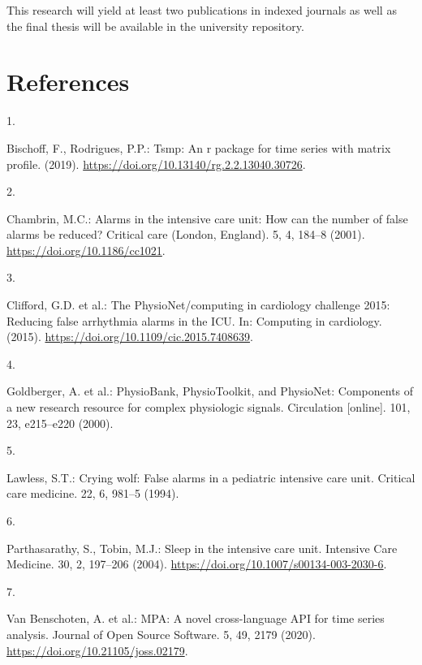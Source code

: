 \documentclass[runningheads]{llncs}
\newlength{\cslhangindent}
\newlength{\csllabelwidth}
\newenvironment{CSLReferences}[2] %
 {%
  \setlength{\parindent}{0pt}
  \ifodd #1 \everypar{\setlength{\hangindent}{\cslhangindent}}\ignorespaces\fi
  \ifnum #2 > 0
  \setlength{\parskip}{#2\baselineskip}
  \fi
 }%
 {}
\newcommand{\CSLLeftMargin}[1]{\parbox[t]{\csllabelwidth}{#1}}
\newcommand{\CSLRightInline}[1]{\parbox[t]{\linewidth - \csllabelwidth}{#1}\break}
\begin{document}
This research will yield at least two publications in indexed journals
as well as the final thesis will be available in the university
repository.

\hypertarget{references}{%
\section*{References}\label{references}}

\hypertarget{refs}{}
\begin{CSLReferences}{0}{0}
\leavevmode{}%
\CSLLeftMargin{1. }
\CSLRightInline{Bischoff, F., Rodrigues, P.P.: Tsmp: An r package for
time series with matrix profile. (2019).
\url{https://doi.org/10.13140/rg.2.2.13040.30726}.}

\leavevmode{}%
\CSLLeftMargin{2. }
\CSLRightInline{Chambrin, M.C.: Alarms in the intensive care unit: How
can the number of false alarms be reduced? Critical care (London,
England). 5, 4, 184--8 (2001). \url{https://doi.org/10.1186/cc1021}.}

\leavevmode{}%
\CSLLeftMargin{3. }
\CSLRightInline{Clifford, G.D. et al.: The PhysioNet/computing in
cardiology challenge 2015: Reducing false arrhythmia alarms in the ICU.
In: Computing in cardiology. (2015).
\url{https://doi.org/10.1109/cic.2015.7408639}.}

\leavevmode{}%
\CSLLeftMargin{4. }
\CSLRightInline{Goldberger, A. et al.: PhysioBank, PhysioToolkit, and
PhysioNet: Components of a new research resource for complex physiologic
signals. Circulation {[}online{]}. 101, 23, e215--e220 (2000).}

\leavevmode{}%
\CSLLeftMargin{5. }
\CSLRightInline{Lawless, S.T.: Crying wolf: False alarms in a pediatric
intensive care unit. Critical care medicine. 22, 6, 981--5 (1994).}

\leavevmode{}%
\CSLLeftMargin{6. }
\CSLRightInline{Parthasarathy, S., Tobin, M.J.: Sleep in the intensive
care unit. Intensive Care Medicine. 30, 2, 197--206 (2004).
\url{https://doi.org/10.1007/s00134-003-2030-6}.}

\leavevmode{}%
\CSLLeftMargin{7. }
\CSLRightInline{Van Benschoten, A. et al.: MPA: A novel cross-language
API for time series analysis. Journal of Open Source Software. 5, 49,
2179 (2020). \url{https://doi.org/10.21105/joss.02179}.}

\end{CSLReferences}
\end{document}
